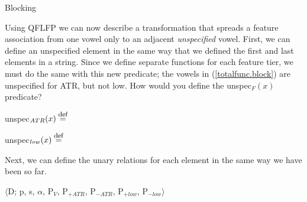 \documentclass[,doc,floatsintext]{apa6}
\def\defeq{\mathrel{\buildrel \mbox{\footnotesize def} \over =}}
\theoremstyle{definition}
\theoremstyle{definition}
\theoremstyle{definition}
\theoremstyle{remark}
\begin{document}
\begin{exe}
  \ex \label{totalfunc.block} Blocking\\
\end{exe}

\noindent Using QFLFP we can now describe a transformation that spreads
a feature association from one vowel only to an adjacent
\emph{unspecified} vowel. First, we can define an unspecified element in
the same way that we defined the first and last elements in a string.
Since we define separate functions for each feature tier, we must do the
same with this new predicate; the vowels in (\ref{totalfunc.block}) are
unspecified for ATR, but not low. How would you define the
unspec\(_F(x)\) predicate?

unspec\(_{ATR}(x) \defeq\) \vspace{0.5in}

unspec\(_{low}(x) \defeq\) \vspace{0.5in}

\noindent Next, we can define the unary relations for each element in
the same way we have been so far.

\begin{exe}
\ex\label{function.block} $\langle$D; p, s, $\alpha$, P$_V$, P$_{+ATR}$, P$_{-ATR}$, P$_{+low}$, P$_{-low}\rangle$ 
\end{exe}
\end{document}
